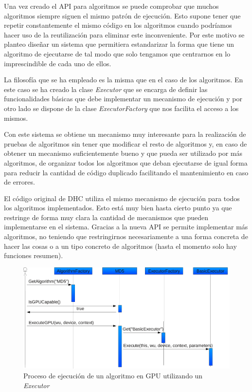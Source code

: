 Una vez creado el API para algoritmos se puede comprobar que muchos algoritmos siempre siguen el mismo patrón de ejecución. Esto supone tener que repetir constantemente el mismo código en los algoritmos cuando podríamos hacer uso de la reutilización para eliminar este inconveniente. Por este motivo se planteo diseñar un sistema que permitiera estandarizar la forma que tiene un algoritmo de ejecutarse de tal modo que solo tengamos que centrarnos en lo imprescindible de cada uno de ellos.

La filosofía que se ha empleado es la misma que en el caso de los algoritmos. En este caso se ha creado la clase \emph{Executor} que se encarga de definir las funcionalidades básicas que debe implementar un mecanismo de ejecución y por otro lado se dispone de la clase \emph{ExecutorFactory} que nos facilita el acceso a los mismos.

Con este sistema se obtiene un mecanismo muy interesante para la realización de pruebas de algoritmos sin tener que modificar el resto de algoritmos y, en caso de obtener un mecanismo suficientemente bueno y que pueda ser utilizado por más algoritmos, de organizar todos los algoritmos que deban ejecutarse de igual forma para reducir la cantidad de código duplicado facilitando el mantenimiento en caso de errores.

El código original de DHC utiliza el mismo mecanismo de ejecución para todos los algoritmos implementados. Esto está muy bien hasta cierto punto ya que restringe de forma muy clara la cantidad de mecanismos que pueden implementarse en el sistema. Gracias a la nueva API se permite implementar más algoritmos, no teniendo que restringirnos necesariamente a una forma concreta de hacer las cosas o a un tipo concreto de algoritmos (hasta el momento solo hay funciones resumen).

\begin{figure}
	\centering
	\includegraphics[width=1\textwidth]{images/executor.pdf}
	\caption{Proceso de ejecución de un algoritmo en GPU utilizando un \emph {Executor}}\label{fig:algotirmo_gpu_executor}
\end{figure}

